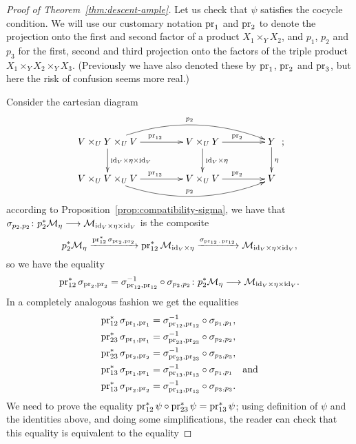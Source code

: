 \begin{4   STACKS}
\begin{4.3 Descent for morphisms of schemes}
\begin{proof}[Proof of Theorem~\ref{thm:descent-ample}]
Let us check that $\psi$ satisfies the cocycle condition. We will use our customary notation $\operatorname{pr}_{1}$ and $\operatorname{pr}_{2}$ to denote the projection onto the first and second factor of a product $X_{1} \times_{Y} X_{2}$, and $p_{1}$, $p_{2}$ and $p_{3}$ for the first, second and third projection onto the factors of the triple product $X_{1} \times_{Y} X_{2} \times_{Y} X_{3}$. (Previously we have also denoted these by $\operatorname{pr}_{1}$, $\operatorname{pr}_{2}$ and $\operatorname{pr}_{3}$, but here the risk of confusion seems more real.)


Consider the cartesian diagram
   \[
   \xymatrix@C+20pt{
   V\times_{U} Y\times_{U} V \ar[r]^{\pr_{12}} \ar@/^1.5pc/[rr]^{p_{2}}   
      \ar[d]^{\id_{V}\times \eta\times \id_{V}}
   & V\times_{U} Y \ar[r]^{\pr_{2}} \ar[d]^{\id_{V}\times \eta}
   & Y \ar[d]^{\eta}
   \\
   V\times_{U} V\times_{U} V \ar[r]^{\pr_{12}} \ar@/_1.5pc/[rr]^{p_{2}}
   &V\times_{U} V \ar[r]^{\pr_{2}}
   &V
   };
   \]
according to Proposition~\ref{prop:compatibility-sigma}, we have that $\sigma_{p_{2},p_{2}}\colon p_{2}^{*}\cM_{\eta} \arr \cM_{\id_{V}\times \eta\times \id_{V}}$ is the composite
   \[
   p_{2}^{*}\mathcal{M}_{\eta} \xrightarrow{\operatorname{pr}_{12}^{*}\sigma_{\operatorname{pr}_{2},\operatorname{pr}_{2}}}
   \operatorname{pr}_{12}^{*}\mathcal{M}_{\mathrm{id}_{V}\times\eta} \xrightarrow{\sigma_{\operatorname{pr}_{12}. \operatorname{pr}_{12}}}
   \mathcal{M}_{\mathrm{id}_{V}\times \eta\times \mathrm{id}_{V}},
   \]
so we have the equality
   \[
   \pr_{12}^{*}\sigma_{\pr_{2},\pr_{2}} =
      \sigma_{\pr_{12},\pr_{12}}^{-1}\circ \sigma_{p_{2},p_{2}}\colon 
   p_{2}^{*}\cM_{\eta} \arr \cM_{\id_{V}\times \eta\times \id_{V}}.
   \]
In a completely analogous fashion we get the equalities
   \begin{align*}
   \operatorname{pr}_{12}^{*}\sigma_{\operatorname{pr}_{1},\operatorname{pr}_{1}} &=
   \sigma_{\operatorname{pr}_{12},\operatorname{pr}_{12}}^{-1} \circ 
      \sigma_{p_{1},p_{1}},\\
   \operatorname{pr}_{23}^{*}\sigma_{\operatorname{pr}_{1},\operatorname{pr}_{1}} &=
   \sigma_{\operatorname{pr}_{23},\operatorname{pr}_{23}}^{-1} \circ 
      \sigma_{p_{2},p_{2}},\\
   \operatorname{pr}_{23}^{*}\sigma_{\operatorname{pr}_{2},\operatorname{pr}_{2}} &=
   \sigma_{\operatorname{pr}_{23},\operatorname{pr}_{23}}^{-1} \circ 
      \sigma_{p_{3},p_{3}},\\
   \operatorname{pr}_{13}^{*}\sigma_{\operatorname{pr}_{1},\operatorname{pr}_{1}} &=
   \sigma_{\operatorname{pr}_{13},\operatorname{pr}_{13}}^{-1} \circ 
      \sigma_{p_{1},p_{1}}\quad\text{and}\\
   \operatorname{pr}_{13}^{*}\sigma_{\operatorname{pr}_{2},\operatorname{pr}_{2}} &=
   \sigma_{\operatorname{pr}_{13},\operatorname{pr}_{13}}^{-1} \circ 
      \sigma_{p_{3},p_{3}}.\\
   \end{align*}
We need to prove the equality $\operatorname{pr}_{12}^{*}\psi \circ \operatorname{pr}_{23}^{*}\psi = \operatorname{pr}_{13}^{*}\psi$; using definition of $\psi$ and the identities above, and doing some simplifications, the reader can check that this equality is equivalent to the equality

\end{proof}
\end{4.3 Descent for morphisms of schemes}
\end{4   STACKS}
